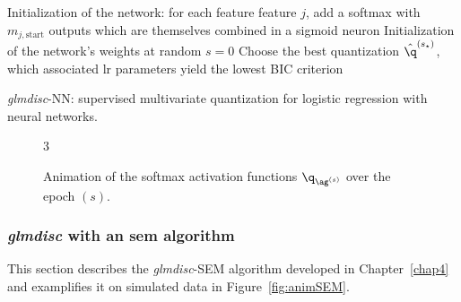 \begin{algorithm}[H]
 Initialization of the network: for each feature feature $j$, add a softmax with $m_{j,\text{start}}$ outputs which are themselves combined in a sigmoid neuron\;
 Initialization of the network's weights at random\;
 $s = 0$\;
 Choose the best quantization $\hat{\q}^{(s_\star)}$, which associated \gls{lr} parameters yield the lowest BIC criterion\;
 \caption{\label{NN-disc} \textit{glmdisc}-NN: supervised multivariate quantization for logistic regression with neural networks.}
\end{algorithm}

\begin{figure}[!h]
\begin{animateinline}[poster=first, controls=all, palindrome, autopause, autoresume, width=\textwidth, height=6cm]{3}
%
\end{animateinline}
\caption{\label{fig:animNN} Animation of the softmax activation functions $\q_{\ag^{(s)}}$ over the epoch $(s)$.}
\end{figure}



\subsubsection{\textit{glmdisc} with an \gls{sem} algorithm} \label{app1:glmdiscSEM}

This section describes the \textit{glmdisc}-SEM algorithm developed in Chapter~\ref{chap4} and examplifies it on simulated data in Figure~\ref{fig:animSEM}.

